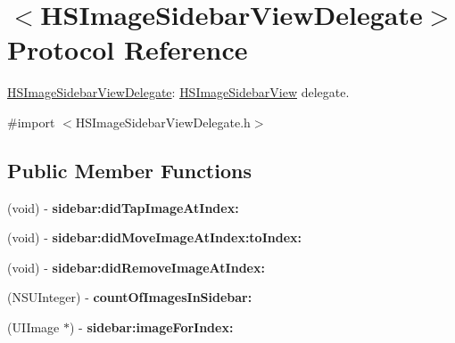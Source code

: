 \hypertarget{protocol_h_s_image_sidebar_view_delegate-p}{
\section{$<$\-H\-S\-Image\-Sidebar\-View\-Delegate$>$ \-Protocol \-Reference}
\label{protocol_h_s_image_sidebar_view_delegate-p}
}


\hyperlink{protocol_h_s_image_sidebar_view_delegate-p}{\-H\-S\-Image\-Sidebar\-View\-Delegate}\-: \hyperlink{interface_h_s_image_sidebar_view}{\-H\-S\-Image\-Sidebar\-View} delegate.  




{\ttfamily \#import $<$\-H\-S\-Image\-Sidebar\-View\-Delegate.\-h$>$}

\subsection*{\-Public \-Member \-Functions}
\begin{DoxyCompactItemize}
\item 
\hypertarget{protocol_h_s_image_sidebar_view_delegate-p_a1f496cf26531bee44d24aabf6b530f2b}{
(void) -\/ {\bfseries sidebar\-:did\-Tap\-Image\-At\-Index\-:}}
\label{protocol_h_s_image_sidebar_view_delegate-p_a1f496cf26531bee44d24aabf6b530f2b}

\item 
\hypertarget{protocol_h_s_image_sidebar_view_delegate-p_a3c4d99ebc5516f2f04eaf6e5e531916a}{
(void) -\/ {\bfseries sidebar\-:did\-Move\-Image\-At\-Index\-:to\-Index\-:}}
\label{protocol_h_s_image_sidebar_view_delegate-p_a3c4d99ebc5516f2f04eaf6e5e531916a}

\item 
\hypertarget{protocol_h_s_image_sidebar_view_delegate-p_a6d4454e6bb1a018e9632e5b915454c67}{
(void) -\/ {\bfseries sidebar\-:did\-Remove\-Image\-At\-Index\-:}}
\label{protocol_h_s_image_sidebar_view_delegate-p_a6d4454e6bb1a018e9632e5b915454c67}

\item 
\hypertarget{protocol_h_s_image_sidebar_view_delegate-p_a4f446a539d521ea50e6b38456e32591e}{
(\-N\-S\-U\-Integer) -\/ {\bfseries count\-Of\-Images\-In\-Sidebar\-:}}
\label{protocol_h_s_image_sidebar_view_delegate-p_a4f446a539d521ea50e6b38456e32591e}

\item 
\hypertarget{protocol_h_s_image_sidebar_view_delegate-p_aa1f7245577a81e8d91f1af29926630b8}{
(\-U\-I\-Image $\ast$) -\/ {\bfseries sidebar\-:image\-For\-Index\-:}}
\label{protocol_h_s_image_sidebar_view_delegate-p_aa1f7245577a81e8d91f1af29926630b8}

\end{DoxyCompactItemize}


